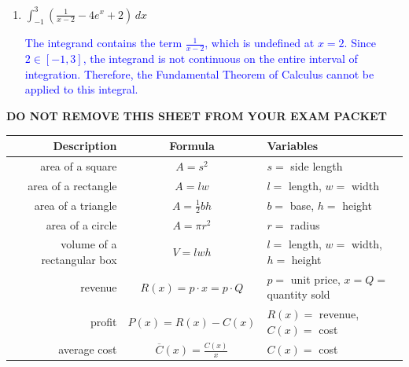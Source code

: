 \documentclass[11pt]{article}
\begin{document}
\begin{enumerate}
\begin{enumerate}
\vfill

\item $\displaystyle \int_{-1}^{3} \left(\frac{1}{x-2} - 4e^x + 2\right)\,dx$

\vfill

\textcolor{blue}{
The integrand contains the term $\frac{1}{x-2}$, which is undefined at $x=2$.
Since $2 \in [-1,3]$, the integrand is not continuous on the entire interval of integration.
Therefore, the Fundamental Theorem of Calculus cannot be applied to this integral.
}

\vfill

\end{enumerate}


\newpage

\begin{center}
{\bf DO NOT REMOVE THIS SHEET FROM YOUR EXAM PACKET}
\end{center}

\begin{center}
    \begin{tabular}{ r | c | l }
    {\bf Description} & {\bf Formula} & {\bf Variables}\\
    \hline
    area of a square & $A=s^2$ & $s=$ side length\\
    \hline
    area of a rectangle & $A=lw$ & $l=$ length, $w=$ width\\
    \hline
    area of a triangle & $A=\frac12bh$ & $b=$ base, $h=$ height\\
    \hline
    area of a circle & $A=\pi r^2$ & $r=$ radius\\
    \hline
    volume of a rectangular box & $V=lwh$ & $l=$ length, $w=$ width, $h=$ height\\
    \hline
    revenue & $R(x) = p\cdot x = p\cdot Q$ & $p=$ unit price, $x=Q=$ quantity sold\\
    \hline
    profit & $P(x) = R(x) - C(x)$ & $R(x)=$ revenue, $C(x)=$ cost\\
    \hline
    average cost & $\overline C(x) = \frac{C(x)}{x}$ & $C(x)=$ cost\\
    \end{tabular}
\end{center}


\end{enumerate}
\end{document}
